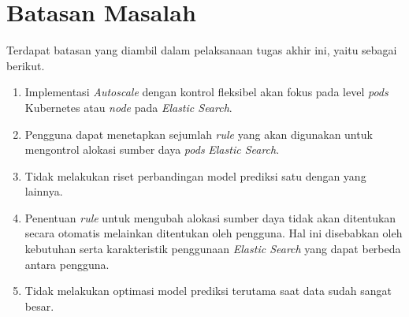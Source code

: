 \section{Batasan Masalah}

Terdapat batasan yang diambil dalam pelaksanaan tugas akhir ini, yaitu sebagai berikut.

\begin{enumerate}
    \item Implementasi \textit{Autoscale} dengan kontrol fleksibel akan fokus pada level \textit{pods} Kubernetes atau \textit{node} pada \textit{Elastic Search}.
    \item Pengguna dapat menetapkan sejumlah \textit{rule} yang akan digunakan untuk mengontrol alokasi sumber daya \textit{pods} \textit{Elastic Search}.
    \item Tidak melakukan riset perbandingan model prediksi satu dengan yang lainnya.
    \item Penentuan \textit{rule} untuk mengubah alokasi sumber daya tidak akan ditentukan secara otomatis melainkan ditentukan oleh pengguna. Hal ini disebabkan oleh kebutuhan serta karakteristik penggunaan \textit{Elastic Search} yang dapat berbeda antara pengguna.
    \item Tidak melakukan optimasi model prediksi terutama saat data sudah sangat besar.
 \end{enumerate}

